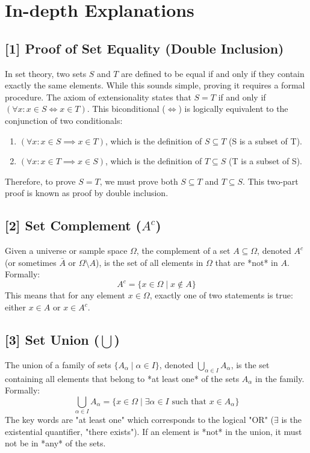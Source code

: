 \documentclass[11pt,a4paper]{article}
\begin{document}
\newpage
\section*{In-depth Explanations}

\hypertarget{ref1}{\subsection*{[1] Proof of Set Equality (Double Inclusion)}}
In set theory, two sets $S$ and $T$ are defined to be equal if and only if they contain exactly the same elements. While this sounds simple, proving it requires a formal procedure. The axiom of extensionality states that $S = T$ if and only if $(\forall x: x \in S \iff x \in T)$. This biconditional ($\iff$) is logically equivalent to the conjunction of two conditionals:
\begin{enumerate}
    \item $(\forall x: x \in S \implies x \in T)$, which is the definition of $S \subseteq T$ (S is a subset of T).
    \item $(\forall x: x \in T \implies x \in S)$, which is the definition of $T \subseteq S$ (T is a subset of S).
\end{enumerate}
Therefore, to prove $S=T$, we must prove both $S \subseteq T$ and $T \subseteq S$. This two-part proof is known as proof by double inclusion.

\hypertarget{ref2}{\subsection*{[2] Set Complement ($A^c$)}}
Given a universe or sample space $\Omega$, the complement of a set $A \subseteq \Omega$, denoted $A^c$ (or sometimes $\bar{A}$ or $\Omega \setminus A$), is the set of all elements in $\Omega$ that are *not* in $A$. Formally:
$$ A^c = \{ x \in \Omega \mid x \notin A \} $$
This means that for any element $x \in \Omega$, exactly one of two statements is true: either $x \in A$ or $x \in A^c$.

\hypertarget{ref3}{\subsection*{[3] Set Union ($\bigcup$)}}
The union of a family of sets $\{A_\alpha \mid \alpha \in I\}$, denoted $\bigcup_{\alpha \in I} A_\alpha$, is the set containing all elements that belong to *at least one* of the sets $A_\alpha$ in the family. Formally:
$$ \bigcup_{\alpha \in I} A_\alpha = \{ x \in \Omega \mid \exists \alpha \in I \text{ such that } x \in A_\alpha \} $$
The key words are "at least one" which corresponds to the logical "OR" ($\exists$ is the existential quantifier, "there exists"). If an element is *not* in the union, it must not be in *any* of the sets.
\end{document}
